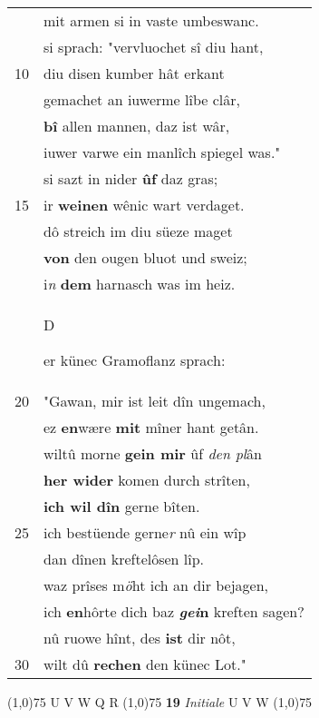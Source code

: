 \documentclass[8pt,a4paper,notitlepage]{article}
\begin{document}
\begin{table}[ht]
\begin{minipage}[t]{0.5\linewidth}
\begin{tabular}{rl}
 & mit armen si in vaste umbeswanc.\\ 
 & si sprach: "vervluochet sî diu hant,\\ 
10 & diu disen kumber hât erkant\\ 
 & gemachet an iuwerme lîbe clâr,\\ 
 & \textbf{bî} allen mannen, daz ist wâr,\\ 
 & iuwer varwe ein manlîch spiegel was."\\ 
 & si sazt in nider \textbf{ûf} daz gras;\\ 
15 & ir \textbf{weinen} wênic wart verdaget.\\ 
 & dô streich im diu süeze maget\\ 
 & \textbf{von} den ougen bluot und sweiz;\\ 
 & i\textit{n} \textbf{dem} harnasch was im heiz.\\ 
 & \begin{large}D\end{large}er künec Gramoflanz sprach:\\ 
20 & "Gawan, mir ist leit dîn ungemach,\\ 
 & ez \textbf{en}wære \textbf{mit} mîner hant getân.\\ 
 & wiltû morne \textbf{gein mir} ûf \textit{den pl}ân\\ 
 & \textbf{her wider} komen durch strîten,\\ 
 & \textbf{ich wil dîn} gerne bîten.\\ 
25 & ich bestüende gerne\textit{r} nû ein wîp\\ 
 & dan dînen kreftelôsen lîp.\\ 
 & waz prîses m\textit{ö}ht ich an dir bejagen,\\ 
 & ich \textbf{en}hôrte dich baz \textbf{\textit{gei}n} kreften sagen?\\ 
 & nû ruowe hînt, des \textbf{ist} dir nôt,\\ 
30 & wilt dû \textbf{rechen} den künec Lot."\\ 
\end{tabular}
\scriptsize
\line(1,0){75} \newline
U V W Q R \newline
\line(1,0){75} \newline
\textbf{19} \textit{Initiale} U V W  \newline
\line(1,0){75} \newline

\end{minipage}
\end{table}
\end{document}
